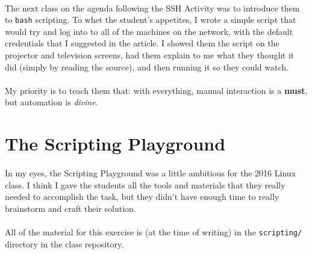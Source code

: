 \documentclass[11pt]{article}
\begin{document}
	\paragraph{} The next class on the agenda following the SSH Activity was to introduce them to \texttt{bash} scripting. To whet the student's appetites, I wrote a simple script that would try and log into to all of the machines on the network, with the default credentials that I suggested in the article. I showed them the script on the projector and television screens, had them explain to me what they thought it did (simply by reading the source), and then running it so they could watch.

	\paragraph{} My priority is to teach them that: with everything, manual interaction is a \textbf{must}, but automation is \textit{divine}.

	\begin{center}
		\graphicspath{ {.} }
		\centering
	\end{center}


	\section{The Scripting Playground}

	\paragraph{} In my eyes, the Scripting Playground was a little ambitious for the 2016 Linux class. I think I gave the students all the tools and materials that they really needed to accomplish the task, but they didn't have enough time to really brainstorm and craft their solution.

	\paragraph{} All of the material for this exercise is (at the time of writing) in the \texttt{scripting/} directory in the class repository.
\end{document}
